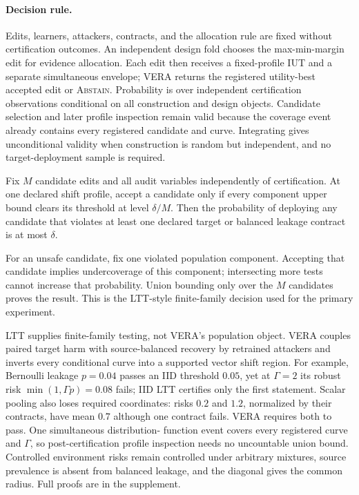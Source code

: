 \paragraph{Decision rule.}
Edits, learners, attackers, contracts, and the allocation rule are fixed without
certification outcomes. An independent design fold chooses the max-min-margin
edit for evidence allocation. Each edit then receives a fixed-profile IUT and a
separate simultaneous envelope; VERA returns the registered utility-best
accepted edit or \textsc{Abstain}. Probability is over independent certification
observations conditional on all construction and design objects. Candidate
selection and later profile inspection remain valid because the coverage event
already contains every registered candidate and curve. Integrating gives
unconditional validity when construction is random but independent, and no
target-deployment sample is required.

\begin{theorem}
Fix $M$ candidate edits and all audit variables independently of certification.
At one declared shift profile, accept a candidate only if every component
upper bound clears its threshold at level $\delta/M$. Then the probability of
deploying any candidate that violates at least one declared target or balanced
leakage contract is at most $\delta$.
\end{theorem}

For an unsafe candidate, fix one violated population component. Accepting that
candidate implies undercoverage of this component; intersecting more tests
cannot increase that probability. Union bounding only over the $M$ candidates
proves the result. This is the LTT-style finite-family decision used for the
primary experiment.

LTT supplies finite-family testing, not VERA's population object. VERA couples
paired target harm with source-balanced recovery by retrained attackers and
inverts every conditional curve into a supported vector shift region. For
example, Bernoulli leakage $p=0.04$ passes an IID threshold $0.05$, yet at
$\Gamma=2$ its robust risk $\min(1,\Gamma p)=0.08$ fails; IID LTT certifies only
the first statement. Scalar pooling also loses required coordinates: risks
$0.2$ and $1.2$, normalized by their contracts, have mean $0.7$ although one
contract fails. VERA requires both to pass. One simultaneous distribution-
function event covers every registered curve and $\Gamma$, so post-certification
profile inspection needs no uncountable union bound. Controlled environment
risks remain controlled under arbitrary mixtures, source prevalence is absent
from balanced leakage, and the diagonal gives the common radius. Full proofs
are in the supplement.

